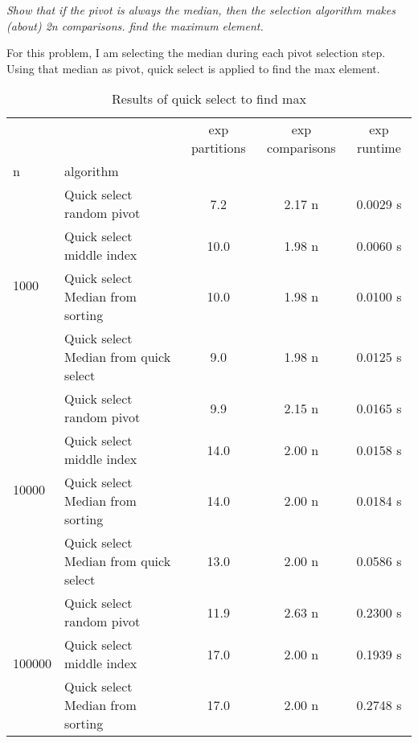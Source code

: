 \documentclass{homeworg}
\begin{document}
\exercise
\emph{Show that if the pivot is always the median, then the selection algorithm makes (about) 2n comparisons. 
find the maximum element.}

For this problem, I am selecting the median during each pivot selection step. Using that median as pivot, quick select is applied to find the max element.

\begin{table}[htbp]
\label{q2:result}
\caption{Results of quick select to find max}

    \begin{tabular}{llccc}
    \toprule
            &                                       &  exp partitions & exp comparisons & exp runtime \\
    n & algorithm &                      &                      &                  \\
    \midrule
    \multirow{4}{*}{1000} & Quick select random pivot &                  7.2 &               2.17 n &   0.0029 s \\
            & Quick select middle index &                 10.0 &               \cellcolor{green} 1.98 n &   0.0060 s \\
            & Quick select Median from sorting &                 10.0 &               \cellcolor{green} 1.98 n &   0.0100 s \\
            & Quick select Median from quick select &                  9.0 &               \cellcolor{green} 1.98 n &   0.0125 s \\
    \cline{1-5}
    \multirow{4}{*}{10000} & Quick select random pivot &                  9.9 &               2.15 n &   0.0165 s \\
            & Quick select middle index &                 14.0 &               \cellcolor{green} 2.00 n &   0.0158 s \\
            & Quick select Median from sorting &                 14.0 &               \cellcolor{green} 2.00 n &   0.0184 s \\
            & Quick select Median from quick select &                 13.0 &               \cellcolor{green} 2.00 n &   0.0586 s \\
    \cline{1-5}
    \multirow{4}{*}{100000} & Quick select random pivot &                 11.9 &               2.63 n &   0.2300 s \\
            & Quick select middle index &                 17.0 &               \cellcolor{green} 2.00 n &   0.1939 s \\
            & Quick select Median from sorting &                 17.0 &               \cellcolor{green} 2.00 n &   0.2748 s \\

\end{tabular}
\end{table}
\end{document}
